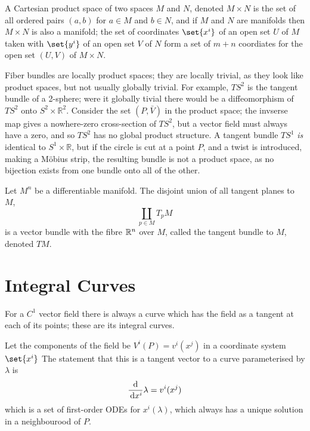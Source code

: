 \begin{definition}
A Cartesian product space of two spaces $M$ and $N$, denoted $M \times
N$ is the set of all ordered pairs $(a,b)$ for $a \in M$ and $b \in
N$, and if $M$ and $N$ are manifolds then $M \times N$ is also a
manifold; the set of coordinates $\set{x^i}$ of an open set $U$ of $M$
taken with $\set{y^i}$ of an open set $V$ of $N$ form a set of $m+n$
coordiates for the open set $(U,V)$ of $M \times N$.
\end{definition}

Fiber bundles are locally product spaces; they are locally trivial, as
they look like product spaces, but not usually globally trivial. For
example, $TS^2$ is the tangent bundle of a 2-sphere; were it globally
tivial there would be a diffeomorphism of $TS^2$ onto $S^2 \times
\mathbb{R}^2$. Consider the set $(P, \bar{V})$ in the product space;
the invserse map gives a nowhere-zero cross-section of $TS^2$, but a
vector field must always have a zero, and so $TS^2$ has no global
product structure. A tangent bundle $TS^1$ \emph{is} identical to $S^1
\times \mathbb{R}$, but if the circle is cut at a point $P$, and a
twist is introduced, making a M\"obius strip, the resulting bundle is
not a product space, as no bijection exists from one bundle onto all
of the other.

\begin{definition}
  Let $M^n$ be a differentiable manifold. The disjoint union of all
  tangent planes to $M$, \[ \coprod_{p \in M} T_p M \] is a vector
  bundle with the fibre $\mathbb{R}^n$ over $M$, called the tangent bundle to
  $M$, denoted $TM$.
\end{definition}

\section{Integral Curves}
\label{sec:vector-fields}

For a $C^1$ vector field there is always a curve which has the field as a tangent at each of its points; these are its integral curves.

Let the components of the field be $V^i(P) = v^i(x^j)$ in a coordinate
system $\set{x^i}$ The statement that this is a tangent vector to a curve parameterised by $\lambda$ is
\begin{equation}
  \label{eq:7}
  \frac{\mathrm{d}}{\,\mathrm{d} x^i}{\lambda} = v^i(x^j)
\end{equation}
which is a set of first-order ODEs for $x^i(\lambda)$, which always
has a unique solution in a neighbourood of $P$.

